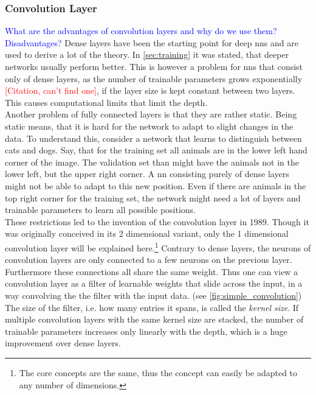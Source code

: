 \subsubsection{Convolution Layer}\label{sec:convolution_layer}
\textcolor{blue}{What are the advantages of convolution layers and why do we use them? Disadvantages?}
Dense layers have been the starting point for deep \gls{nns} and are used to derive a lot of the theory. In \autoref{sec:training} it was stated, that deeper networks usually perform better. This is however a problem for \gls{nns} that consist only of dense layers, as the number of trainable parameters grows exponentially \textcolor{red}{[Citation, can't find one]}, if the layer size is kept constant between two layers. This causes computational limits that limit the depth.\\
Another problem of fully connected layers is that they are rather static. Being static means, that it is hard for the network to adapt to slight changes in the data. To understand this, consider a network that learns to distinguish between cats and dogs. Say, that for the training set all animals are in the lower left hand corner of the image. The validation set than might have the animals not in the lower left, but the upper right corner. A \gls{nn} consisting purely of dense layers might not be able to adapt to this new position. Even if there are animals in the top right corner for the training set, the network might need a lot of layers and trainable parameters to learn all possible positions.\\
These restrictions led to the invention of the convolution layer in 1989. \cite{convolution_layer_invention} Though it was originally conceived in its 2 dimensional variant, only the 1 dimensional convolution layer will be explained here.\footnote{The core concepts are the same, thus the concept can easily be adapted to any number of dimensions.} Contrary to dense layers, the neurons of convolution layers are only connected to a few neurons on the previous layer. Furthermore these connections all share the same weight. Thus one can view a convolution layer as a filter of learnable weights that slide across the input, in a way convolving the the filter with the input data. (see \autoref{fig:simple_convolution})\\
The size of the filter, i.e. how many entries it spans, is called the \emph{kernel size}. If multiple convolution layers with the same kernel size are stacked, the number of trainable parameters increases only linearly with the depth, which is a huge improvement over dense layers.\\
